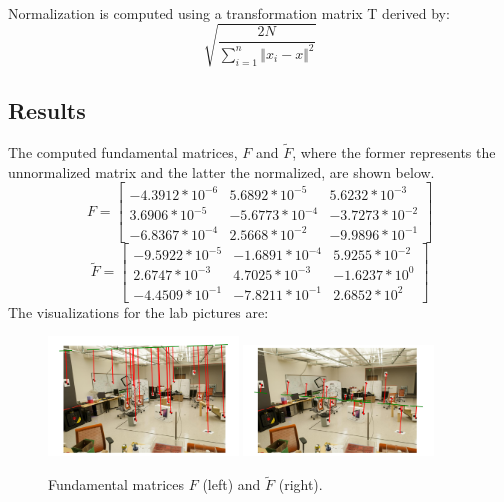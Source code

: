 {\\Normalization is computed using a transformation matrix T derived by:
\begin{equation}
	\sqrt{\frac{2N}{\sum_{i=1}^{n}\Vert x_i - x \Vert^2}}
\end{equation}
\subsection{Results}
The computed fundamental matrices, \( F \) and \( \tilde{F} \), where the former represents the unnormalized matrix and the latter the normalized, are shown below.
\begin{equation}
	F = \begin{bmatrix}
		-4.3912 * 10^{-6} &  5.6892 * 10^{-5} &  5.6232 * 10^{-3}\\
		 3.6906 * 10^{-5} & -5.6773 * 10^{-4} & -3.7273 * 10^{-2}\\
		-6.8367 * 10^{-4} &  2.5668 * 10^{-2} & -9.9896 * 10^{-1}
		\end{bmatrix}
\end{equation}
\begin{equation}
	\tilde{F} = \begin{bmatrix}
		-9.5922 * 10^{-5} & -1.6891 * 10^{-4} & 5.9255 * 10^{-2} \\
		2.6747 * 10^{-3} & 4.7025 * 10^{-3} & -1.6237 * 10^{0} \\
		-4.4509 * 10^{-1} & -7.8211 * 10^{-1} & 2.6852 * 10^{2}
	\end{bmatrix}
\end{equation}
The visualizations for the lab pictures are:

\begin{figure}[h!]
	\centering
	\includegraphics[width=0.45\textwidth]{./student_response/results/lab-F_unnorm.png}
	\includegraphics[width=0.45\textwidth]{./student_response/results/lab-F_norm.png}
	\caption{Fundamental matrices \( F \) (left) and \( \tilde{F} \) (right).}
\end{figure}

}

